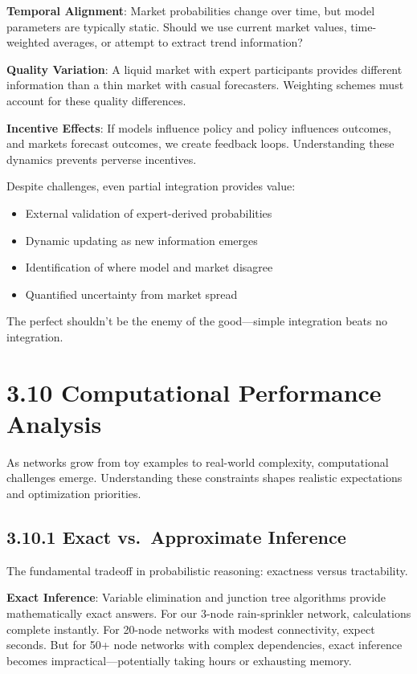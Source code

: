 \documentclass[
  11pt,
  letterpaper,
  openany]{book}
\providecommand{\tightlist}{%
  \setlength{\itemsep}{0pt}\setlength{\parskip}{0pt}}
\begin{document}
\textbf{Temporal Alignment}: Market probabilities change over time, but
model parameters are typically static. Should we use current market
values, time-weighted averages, or attempt to extract trend information?

\textbf{Quality Variation}: A liquid market with expert participants
provides different information than a thin market with casual
forecasters. Weighting schemes must account for these quality
differences.

\textbf{Incentive Effects}: If models influence policy and policy
influences outcomes, and markets forecast outcomes, we create feedback
loops. Understanding these dynamics prevents perverse incentives.

Despite challenges, even partial integration provides value:

\begin{itemize}
\tightlist
\item
  External validation of expert-derived probabilities
\item
  Dynamic updating as new information emerges
\item
  Identification of where model and market disagree
\item
  Quantified uncertainty from market spread
\end{itemize}

The perfect shouldn't be the enemy of the good---simple integration
beats no integration.

\section{3.10 Computational Performance
Analysis}\label{sec-computational-performance-analysis}

As networks grow from toy examples to real-world complexity,
computational challenges emerge. Understanding these constraints shapes
realistic expectations and optimization priorities.

\subsection{3.10.1 Exact vs.~Approximate
Inference}\label{sec-exact-approximate}

The fundamental tradeoff in probabilistic reasoning: exactness versus
tractability.

\textbf{Exact Inference}: Variable elimination and junction tree
algorithms provide mathematically exact answers. For our 3-node
rain-sprinkler network, calculations complete instantly. For 20-node
networks with modest connectivity, expect seconds. But for 50+ node
networks with complex dependencies, exact inference becomes
impractical---potentially taking hours or exhausting memory.
\end{document}
